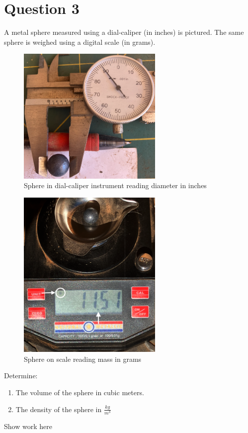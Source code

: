 \documentclass[12pt]{article}
\begin{document}
\section*{Question 3}
A metal sphere measured using a dial-caliper (in inches) is pictured. The same sphere is weighed using a digital scale (in grams). 
\begin{figure}[h!] %
   \centering
   \includegraphics[width=2.75in]{sphere-dimension.png} 
   \caption{Sphere in dial-caliper instrument reading diameter in inches}
   \label{fig:sphere-dimension}
\end{figure}

\begin{figure}[h!] %
   \centering
   \includegraphics[width=2.75in]{sphere-mass.png} 
   \caption{Sphere on scale reading mass in grams}
   \label{fig:sphere-mass}
\end{figure}
\newpage
Determine:
\begin{enumerate}
\item The volume of the sphere in cubic meters.
\item The density of the sphere in $\frac{kg}{m^3}$
\end{enumerate}
\clearpage
Show work here
\clearpage
\end{document}
